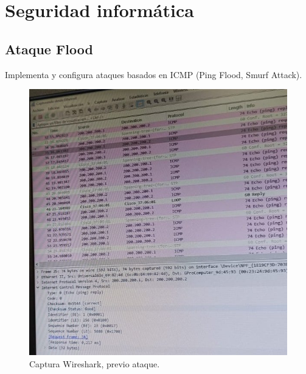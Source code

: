 \section{Seguridad informática}

\subsection{Ataque Flood}
Implementa y configura ataques basados en ICMP (Ping Flood, Smurf Attack).

\begin{figure}[H]
    \centering
    \includegraphics[width=0.75\columnwidth]{punto2/images/1_ping.jpeg}
    \caption{Captura Wireshark, previo ataque.}
\end{figure}


